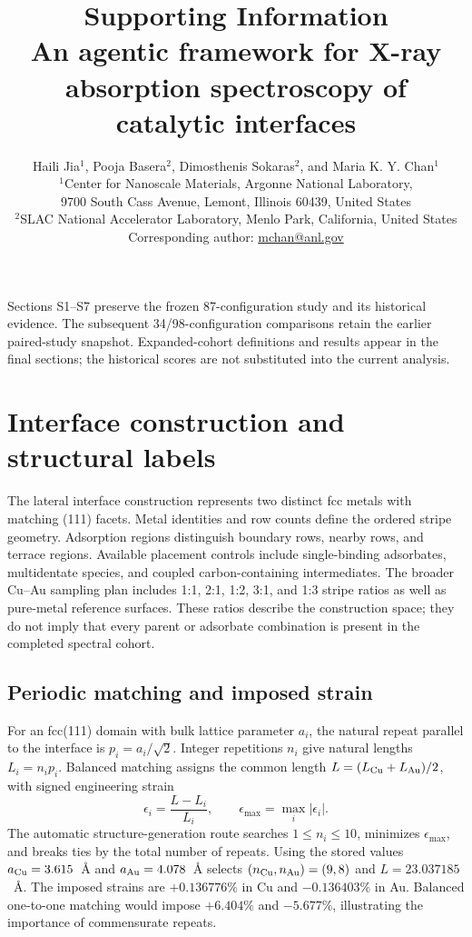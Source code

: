 \documentclass[11pt,a4paper]{article}
\title{Supporting Information\\[0.5em]\large An agentic framework for X-ray absorption spectroscopy of catalytic interfaces}
\author{Haili Jia$^{1}$, Pooja Basera$^{2}$, Dimosthenis Sokaras$^{2}$, and Maria K. Y. Chan$^{1}$\\[0.6em]
\small $^{1}$Center for Nanoscale Materials, Argonne National Laboratory,\\
\small 9700 South Cass Avenue, Lemont, Illinois 60439, United States\\[0.3em]
\small $^{2}$SLAC National Accelerator Laboratory, Menlo Park, California, United States\\[0.3em]\small Corresponding author: \href{mailto:mchan@anl.gov}{mchan@anl.gov}}
\date{}
\begin{document}
\maketitle
\noindent Sections S1--S7 preserve the frozen 87-configuration study and its historical evidence. The subsequent 34/98-configuration comparisons retain the earlier paired-study snapshot. Expanded-cohort definitions and results appear in the final sections; the historical scores are not substituted into the current analysis.
\section{Interface construction and structural labels}
The lateral interface construction represents two distinct fcc metals with matching (111) facets. Metal identities and row counts define the ordered stripe geometry. Adsorption regions distinguish boundary rows, nearby rows, and terrace regions. Available placement controls include single-binding adsorbates, multidentate species, and coupled carbon-containing intermediates. The broader Cu--Au sampling plan includes 1:1, 2:1, 1:2, 3:1, and 1:3 stripe ratios as well as pure-metal reference surfaces. These ratios describe the construction space; they do not imply that every parent or adsorbate combination is present in the completed spectral cohort.

\subsection{Periodic matching and imposed strain}
For an fcc(111) domain with bulk lattice parameter $a_i$, the natural repeat parallel to the interface is $p_i=a_i/\sqrt{2}$. Integer repetitions $n_i$ give natural lengths $L_i=n_i p_i$. Balanced matching assigns the common length $L=(L_{\rm Cu}+L_{\rm Au})/2$, with signed engineering strain
\begin{equation}
\epsilon_i=\frac{L-L_i}{L_i},\qquad
\epsilon_{\max}=\max_i|\epsilon_i|.
\end{equation}
The automatic structure-generation route searches $1\le n_i\le10$, minimizes $\epsilon_{\max}$, and breaks ties by the total number of repeats. Using the stored values $a_{\rm Cu}=3.615$~\AA{} and $a_{\rm Au}=4.078$~\AA{} selects $(n_{\rm Cu},n_{\rm Au})=(9,8)$ and $L=23.037185$~\AA{}. The imposed strains are $+0.136776\%$ in Cu and $-0.136403\%$ in Au. Balanced one-to-one matching would impose $+6.404\%$ and $-5.677\%$, illustrating the importance of commensurate repeats.
\end{document}
